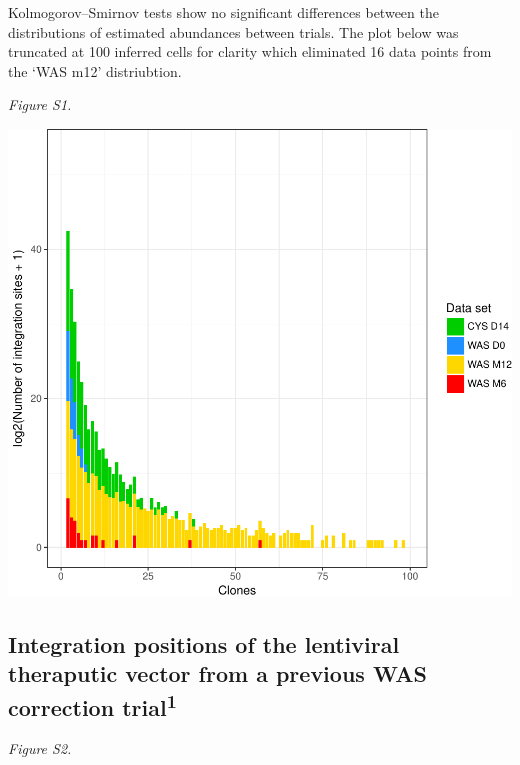 \documentclass[12pt,]{article}
\begin{document}
Kolmogorov--Smirnov tests show no significant differences between the
distributions of estimated abundances between trials. The plot below was
truncated at 100 inferred cells for clarity which eliminated 16 data
points from the `WAS m12' distriubtion.

\emph{Figure S1.}

\includegraphics{project_files/figure-latex/FigS1-1.pdf}

\newpage

\subsection{\texorpdfstring{Integration positions of the lentiviral
theraputic vector from a previous WAS correction
trial\textsuperscript{1}}{Integration positions of the lentiviral theraputic vector from a previous WAS correction trial1}}\label{integration-positions-of-the-lentiviral-theraputic-vector-from-a-previous-was-correction-trial1}

\emph{Figure S2.}
\end{document}
